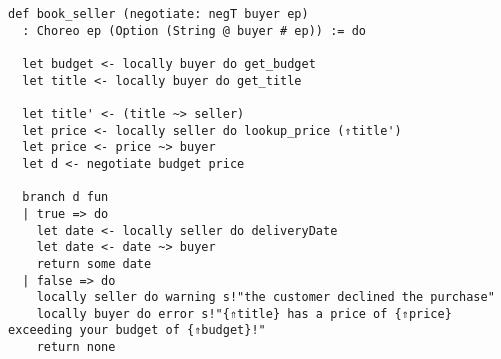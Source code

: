 \begin{lstlisting}[language=lean]
def book_seller (negotiate: negT buyer ep)
  : Choreo ep (Option (String @ buyer # ep)) := do

  let budget <- locally buyer do get_budget
  let title <- locally buyer do get_title

  let title' <- (title ~> seller)
  let price <- locally seller do lookup_price (⇑title')
  let price <- price ~> buyer
  let d <- negotiate budget price

  branch d fun
  | true => do
    let date <- locally seller do deliveryDate
    let date <- date ~> buyer
    return some date
  | false => do
    locally seller do warning s!"the customer declined the purchase"
    locally buyer do error s!"{⇑title} has a price of {⇑price} exceeding your budget of {⇑budget}!"
    return none

\end{lstlisting}
